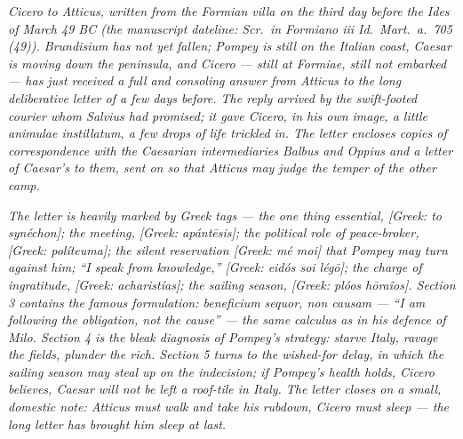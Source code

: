 
\textit{Cicero to Atticus, written from the Formian
villa on the third day before the Ides of March 49 BC
(the manuscript dateline: \textit{Scr.\ in Formiano iii
Id.\ Mart.\ a.\ 705 (49)}). Brundisium has not yet
fallen; Pompey is still on the Italian coast, Caesar is
moving down the peninsula, and Cicero --- still at
Formiae, still not embarked --- has just received a
full and consoling answer from Atticus to the long
deliberative letter of a few days before. The reply
arrived by the swift-footed courier whom Salvius had
promised; it gave Cicero, in his own image, a little
\textit{animulae instillatum}, a few drops of life
trickled in. The letter encloses copies of correspondence
with the Caesarian intermediaries Balbus and Oppius and
a letter of Caesar's to them, sent on so that Atticus
may judge the temper of the other camp.}

\textit{The letter is heavily marked by Greek tags ---
the one thing essential, \textit{[Greek: to syn\'echon]};
the meeting, \textit{[Greek: ap\'ant\=esis]}; the
political role of peace-broker, \textit{[Greek:
pol\'iteuma]}; the silent reservation \textit{[Greek:
m\'e moi]} that Pompey may turn against him; ``I speak
from knowledge,'' \textit{[Greek: eid\'os soi l\'eg\=o]};
the charge of ingratitude, \textit{[Greek:
acharist\'ias]}; the sailing season, \textit{[Greek:
pl\'oos h\=ora\^ios]}. Section 3 contains the famous
formulation: \textit{beneficium sequor, non causam}
--- ``I am following the obligation, not the cause'' ---
the same calculus as in his defence of Milo. Section 4
is the bleak diagnosis of Pompey's strategy: starve
Italy, ravage the fields, plunder the rich. Section 5
turns to the wished-for delay, in which the sailing
season may steal up on the indecision; if Pompey's
health holds, Cicero believes, Caesar will not be left
a roof-tile in Italy. The letter closes on a small,
domestic note: Atticus must walk and take his rubdown,
Cicero must sleep --- the long letter has brought him
sleep at last.}
